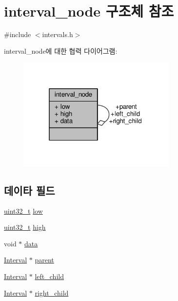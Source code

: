 \hypertarget{structinterval__node}{}\section{interval\+\_\+node 구조체 참조}
\label{structinterval__node}


{\ttfamily \#include $<$intervals.\+h$>$}



interval\+\_\+node에 대한 협력 다이어그램\+:
\nopagebreak
\begin{figure}[H]
\begin{center}
\leavevmode
\includegraphics[width=223pt]{structinterval__node__coll__graph}
\end{center}
\end{figure}
\subsection*{데이타 필드}
\begin{DoxyCompactItemize}
\item 
\hyperlink{parse_8c_a6eb1e68cc391dd753bc8ce896dbb8315}{uint32\+\_\+t} \hyperlink{structinterval__node_a864f755b7008df85b29726891bdd4fbd}{low}
\item 
\hyperlink{parse_8c_a6eb1e68cc391dd753bc8ce896dbb8315}{uint32\+\_\+t} \hyperlink{structinterval__node_a0d90a9fe74bca2dccde7f81cddfdf7b0}{high}
\item 
void $\ast$ \hyperlink{structinterval__node_a735984d41155bc1032e09bece8f8d66d}{data}
\item 
\hyperlink{intervals_8h_af6f1ab89800839a9266a6dd11c2bc7ce}{Interval} $\ast$ \hyperlink{structinterval__node_a19c68cbcb58e99454185ab1aa37de6e8}{parent}
\item 
\hyperlink{intervals_8h_af6f1ab89800839a9266a6dd11c2bc7ce}{Interval} $\ast$ \hyperlink{structinterval__node_a6a3f189bd13197563c4edd38008e5ad5}{left\+\_\+child}
\item 
\hyperlink{intervals_8h_af6f1ab89800839a9266a6dd11c2bc7ce}{Interval} $\ast$ \hyperlink{structinterval__node_a65f75e0585d71e757722bf624913127f}{right\+\_\+child}
\end{DoxyCompactItemize}



